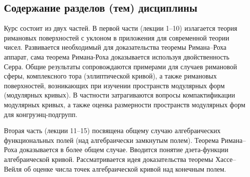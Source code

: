 \documentclass[a4paper, 12pt]{article}
\begin{document}
\subsection{Содержание разделов (тем) дисциплины}

Курс состоит из двух частей. В первой части (лекции 1--10) излагается теория римановых поверхностей с уклоном в приложения для современной теории чисел. Развивается необходимый для доказательства теоремы Римана--Роха аппарат, сама теорема Римана-Роха доказывается используя двойственность Серра. Общие результаты сопровождаются примерами для случаев римановой сферы, комплексного тора (эллиптической кривой), а также римановых поверхностей, возникающих при изучении пространств модулярных форм (модулярных кривых). В частности затрагиваются вопросы компактификации модулярных кривых, а также оценка размерности пространств модулярных форм для конгруэнц-подгрупп.

Вторая часть (лекции 11--15) посвящена общему случаю алгебраических функциональных полей (над алгебраически замкнутым полем). Теорема Римана--Роха доказывается в более общем случае. Вводится понятие дзета-функции алгебраической кривой. Рассматривается идея доказательства теоремы Хассе--Вейля об оценке числа точек алгебраической кривой над конечным полем.

\vspace{8pt}
\end{document}
